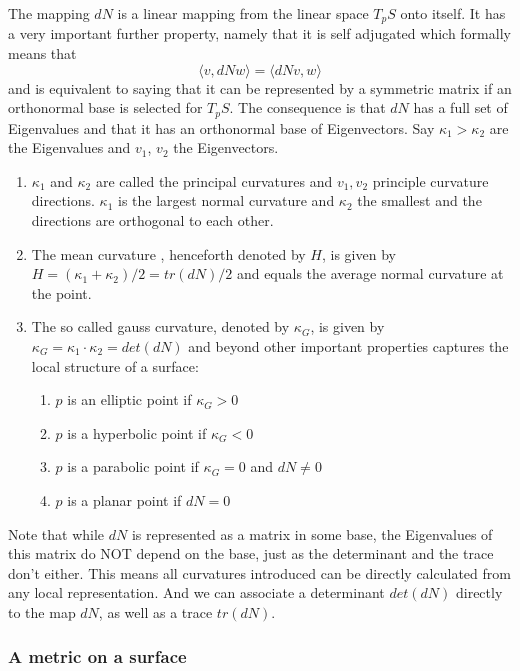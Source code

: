 The mapping $dN$ is a linear mapping from the linear space $T_pS$ onto itself. It has a very important further property, namely that it is self adjugated which formally means that
\[\langle v, dNw\rangle = \langle dN v, w \rangle\]
and is equivalent to saying that it can be represented by a symmetric matrix if an orthonormal base is selected for $T_pS$. The consequence is that $dN$ has a full set of Eigenvalues and that it has an orthonormal base of Eigenvectors. Say $\kappa_1 > \kappa_2$ are the Eigenvalues and $v_1$, $v_2$ the Eigenvectors.
\begin{enumerate}
\item $\kappa_1$ and $\kappa_2$ are called the principal curvatures and $v_1, v_2$ principle curvature directions. $\kappa_1$ is the largest normal curvature and $\kappa_2$ the smallest and the directions are orthogonal to each other. 
\item The mean curvature , henceforth denoted by $H$, is given by $H = (\kappa_1 + \kappa_2)/2 = tr(dN)/2$ and equals the average normal curvature at the point.
\item The so called gauss curvature, denoted by $\kappa_G$, is given by $\kappa_G = \kappa_1 \cdot \kappa_2 = det(dN)$ and beyond other important properties captures the local structure of a surface:

 
\begin{enumerate}
\item $p$ is an elliptic point if $\kappa_G >0$
\item $p$ is a hyperbolic point if $\kappa_G <0$
\item $p$ is a parabolic point if $\kappa_G =0$ and $dN \neq 0$
\item $p$ is a planar point if $dN =0$
\end{enumerate}
\end{enumerate}
 Note that while $dN$ is represented as a matrix in some base, the Eigenvalues of this matrix do NOT depend on the base, just as the determinant and the trace don't either. This means all curvatures introduced can be directly calculated from any local representation. And we can associate a determinant $det (dN)$  directly to the map $dN$, as well as a trace $tr(dN)$.
 
\subsubsection{A metric on a surface}

